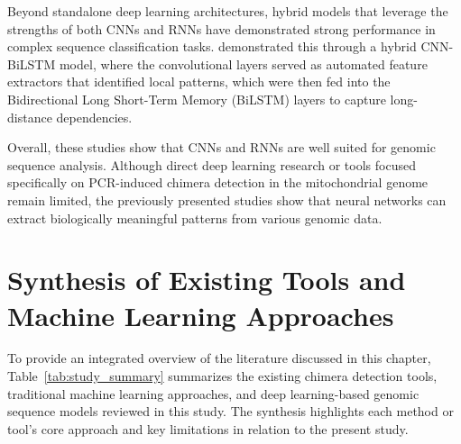 Beyond standalone deep learning architectures, hybrid models that leverage the strengths of both CNNs and RNNs have demonstrated strong performance in complex sequence classification tasks. \citet{Tabane2025} demonstrated this through a hybrid CNN-BiLSTM model, where the convolutional layers served as automated feature extractors that identified local patterns, which were then fed into the Bidirectional Long Short-Term Memory (BiLSTM) layers to capture long-distance dependencies.

Overall, these studies show that CNNs and RNNs are well suited for genomic sequence analysis. Although direct deep learning research or tools focused specifically on PCR-induced chimera detection in the mitochondrial genome remain limited, the previously presented studies show that neural networks can extract biologically meaningful patterns from various genomic data.


\section{Synthesis of Existing Tools and Machine Learning Approaches}

To provide an integrated overview of the literature discussed in this chapter, Table~\ref{tab:study_summary} summarizes the existing chimera detection tools, traditional machine learning approaches, and deep learning-based genomic sequence models reviewed in this study. The synthesis highlights each method or tool’s core approach and key limitations in relation to the present study.

